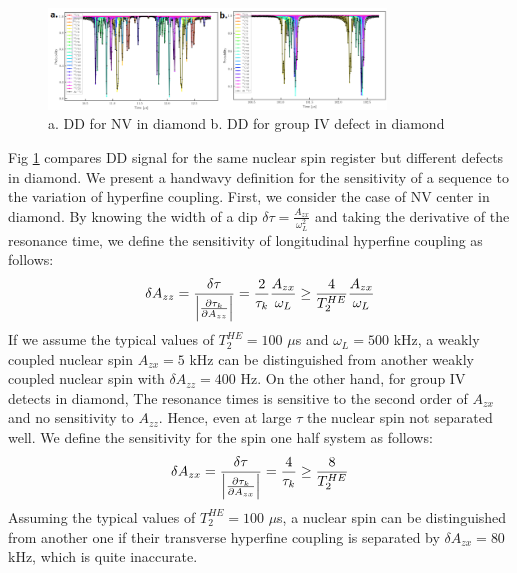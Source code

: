 \documentclass[%
 reprint,
superscriptaddress,
 amsmath,amssymb,
 aps,
]{revtex4-2}
\begin{document}
\begin{figure}[htbp]
	\begin{center}
		\includegraphics[width=0.8\textwidth]{pict/fig3.png}
		\caption{a. DD for NV in diamond b. DD for group IV defect in diamond }
		\label{fig:3}
	\end{center}
\end{figure}
Fig \ref{fig:3} compares DD signal for the same nuclear spin register but different defects in diamond. We present a handwavy definition for the sensitivity of a sequence to the variation of hyperfine coupling. First, we consider the case of NV center in diamond. By knowing the width of a dip $\delta \tau = \frac{A_{zx}}{\omega_L^2}$  and taking the derivative of the resonance time, we define the sensitivity of longitudinal hyperfine coupling as follows:
\begin{gather}
	\delta A_{zz} = \frac{\delta \tau}{\abs{\frac{\partial \tau_k}{\partial A_{zz}}}} = \frac{2}{\tau_k} \frac{A_{zx}}{\omega_L} \ge \frac{4}{T_2^{HE}} \frac{A_{zx}}{\omega_L}
\end{gather}
If we assume the typical values of $T_2^{HE} = 100 $ $\mu$s and $\omega_L=500 $ kHz, a weakly coupled nuclear spin $A_{zx}=5$ kHz can be distinguished from another weakly coupled nuclear spin with $\delta A_{zz} = 400$ Hz. On the other hand, for group IV detects in diamond, The resonance times is sensitive to the second order of $A_{zx}$ and no sensitivity to $A_{zz}$. Hence, even at large $\tau$ the nuclear spin not separated well. We define the sensitivity for the spin one half system as follows:
\begin{gather}
	\delta A_{zx} = \frac{\delta \tau}{\abs{\frac{\partial \tau_k}{\partial A_{zx}}}} = \frac{4}{\tau_k} \ge \frac{8}{T_2^{HE}}
\end{gather}
Assuming the typical values of $T_2^{HE} = 100 $ $\mu$s, a nuclear spin can be distinguished from another one if their transverse hyperfine coupling is separated by $\delta A_{zx} = 80$ kHz, which is quite inaccurate.\\
\end{document}
